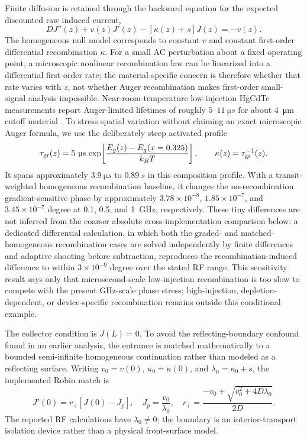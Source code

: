 \documentclass[11pt]{article}
\begin{document}
Finite diffusion is retained through the backward equation for the expected discounted raw induced current,
\begin{equation}
\boxed{
D J''(z)+v(z)J'(z)-[\kappa(z)+s]J(z)=-v(z).}
\label{eq:hgbvp}
\end{equation}
The homogeneous null model corresponds to constant $v$ and constant first-order differential recombination $\kappa$. For a small AC perturbation about a fixed operating point, a microscopic nonlinear recombination law can be linearized into a differential first-order rate; the material-specific concern is therefore whether that rate varies with $z$, not whether Auger recombination makes first-order small-signal analysis impossible. Near-room-temperature low-injection HgCdTe measurements report Auger-limited lifetimes of roughly $5$--$11~\si{\micro s}$ for about \SI{4}{\micro\meter} cutoff material \cite{Kopytko2021}. To stress spatial variation without claiming an exact microscopic Auger formula, we use the deliberately steep activated profile
\begin{equation}
\tau_{\rm gr}(z)=5~\si{\micro s}\,\exp\!\left[\frac{E_g(z)-E_g(x=0.325)}{k_BT}\right],\qquad \kappa(z)=\tau_{\rm gr}^{-1}(z).
\label{eq:hg_graded_kappa}
\end{equation}
It spans approximately $3.9~\si{\micro s}$ to $0.89~\si{s}$ in this composition profile. With a transit-weighted homogeneous recombination baseline, it changes the no-recombination gradient-sensitive phase by approximately $3.78\times10^{-8}$, $1.85\times10^{-7}$, and $3.45\times10^{-7}$ degree at 0.1, 0.5, and \SI{1}{GHz}, respectively. These tiny differences are not inferred from the coarser absolute cross-implementation comparison below: a dedicated differential calculation, in which both the graded- and matched-homogeneous recombination cases are solved independently by finite differences and adaptive shooting before subtraction, reproduces the recombination-induced difference to within $3\times10^{-9}$ degree over the stated RF range. This sensitivity result says only that microsecond-scale low-injection recombination is too slow to compete with the present GHz-scale phase stress; high-injection, depletion-dependent, or device-specific recombination remains outside this conditional example.

The collector condition is $J(L)=0$. To avoid the reflecting-boundary confound found in an earlier analysis, the entrance is matched mathematically to a bounded semi-infinite homogeneous continuation rather than modeled as a reflecting surface. Writing $v_0=v(0)$, $\kappa_0=\kappa(0)$, and $\lambda_0=\kappa_0+s$, the implemented Robin match is
\begin{equation}
\boxed{J'(0)=r_+[J(0)-J_p],\quad J_p=\frac{v_0}{\lambda_0},\quad r_+=\frac{-v_0+\sqrt{v_0^2+4D\lambda_0}}{2D}.}
\label{eq:hg_robin}
\end{equation}
The reported RF calculations have $\lambda_0\neq0$; the boundary is an interior-transport isolation device rather than a physical front-surface model.
\end{document}
